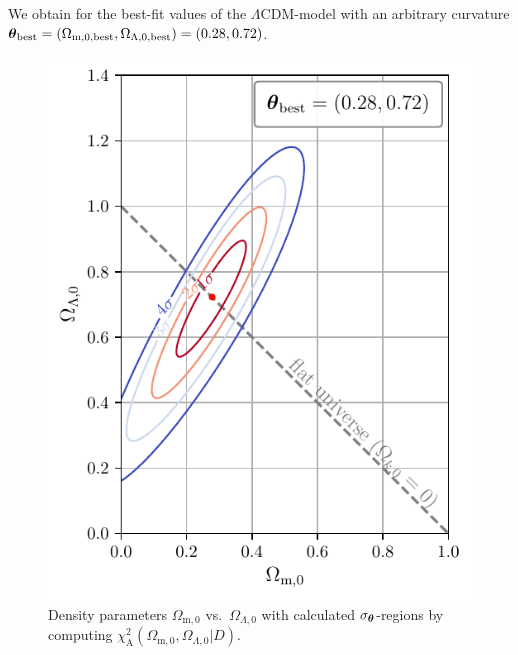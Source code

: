 \noindent We obtain for the best-fit values of the $\Lambda$CDM-model with an arbitrary curvature \\
${\vb*{\theta}_{\text{best}} = (\Omega_{\text{m}, 0, \text{best}}, \Omega_{\Lambda, 0, \text{best}}) = (0.28, 0.72)}$.

\begin{figure}[H]
    \centering
    \includegraphics[scale=1.25]{figures/plots/PDF/Lambda-CDM-analytic-chi2_Omega-m0-vs-Omega-Lambda0.pdf}
    \caption{Density parameters $\Omega_{\text{m},0}$ vs.\ $\Omega_{\Lambda,0}$ with calculated $\sigma_{\vb*{\theta}}$-regions by computing $\chi_{\text{A}}^2(\Omega_{\text{m},0}, \Omega_{\Lambda,0} \vert D)$.}
    \label{fig:Lambda-CDM-analytic-chi2_Omega-m0-vs-Omega-Lambda0}
\end{figure}

